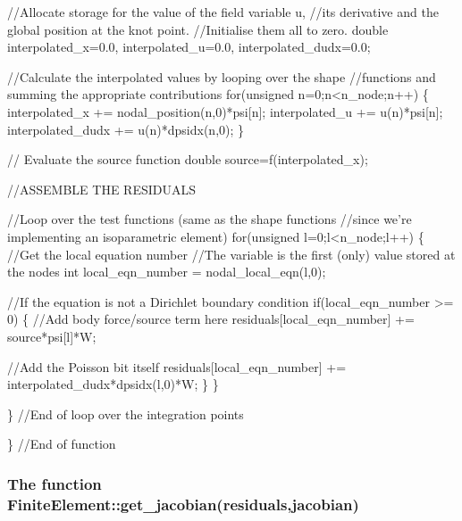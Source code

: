 \begin{DoxyCodeInclude}
      \textcolor{comment}{//Allocate storage for the value of the field variable u,}
      \textcolor{comment}{//its derivative and the global position at the knot point.}
      \textcolor{comment}{//Initialise them all to zero.}
      \textcolor{keywordtype}{double} interpolated\_x=0.0, interpolated\_u=0.0, interpolated\_dudx=0.0;

      \textcolor{comment}{//Calculate the interpolated values by  looping over the shape }
      \textcolor{comment}{//functions and summing the appropriate contributions}
      \textcolor{keywordflow}{for}(\textcolor{keywordtype}{unsigned} n=0;n<n\_node;n++) 
       \{
        interpolated\_x += nodal\_position(n,0)*psi[n];
        interpolated\_u += u(n)*psi[n];
        interpolated\_dudx += u(n)*dpsidx(n,0);
       \}
      
      \textcolor{comment}{// Evaluate the source function}
      \textcolor{keywordtype}{double} source=f(interpolated\_x);

      \textcolor{comment}{//ASSEMBLE THE RESIDUALS}
      
      \textcolor{comment}{//Loop over the test functions (same as the shape functions}
      \textcolor{comment}{//since we're implementing an isoparametric element)}
      \textcolor{keywordflow}{for}(\textcolor{keywordtype}{unsigned} l=0;l<n\_node;l++)
       \{
        \textcolor{comment}{//Get the local equation number}
        \textcolor{comment}{//The variable is the first (only) value stored at the nodes}
        \textcolor{keywordtype}{int} local\_eqn\_number = nodal\_local\_eqn(l,0);

        \textcolor{comment}{//If the equation is not a Dirichlet boundary condition}
        \textcolor{keywordflow}{if}(local\_eqn\_number >= 0)
         \{
          \textcolor{comment}{//Add body force/source term here }
          residuals[local\_eqn\_number] += source*psi[l]*W;

          \textcolor{comment}{//Add the Poisson bit itself}
          residuals[local\_eqn\_number] += interpolated\_dudx*dpsidx(l,0)*W;
         \}
       \}

     \} \textcolor{comment}{//End of loop over the integration points}

   \} \textcolor{comment}{//End of function}

\end{DoxyCodeInclude}
\hypertarget{index_jac}{}\subsubsection{The function Finite\+Element\+::get\+\_\+jacobian(residuals,jacobian)}\label{index_jac}
